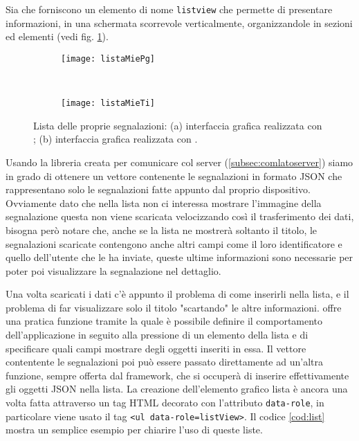             Sia \kendomob{} che \tisdk{} forniscono un elemento di nome \texttt{listview}
            che permette di presentare informazioni, in una schermata scorrevole
            verticalmente, organizzandole in sezioni ed elementi (vedi fig. \ref{fig:mieTiPg}).

            \begin{figure}[H]
              \centering
              \begin{subfigure}[b]{0.485\textwidth}
                \texttt{[image: listaMiePg]}
                \caption{}
              \end{subfigure}
              ~
              \begin{subfigure}[b]{0.485\textwidth}
                \texttt{[image: listaMieTi]}
                \caption{}
              \end{subfigure}
              \caption{Lista delle  proprie segnalazioni:
                (a) interfaccia grafica realizzata con \kendomob{};
                (b) interfaccia grafica realizzata con \tisdk{}.
                }
              \label{fig:mieTiPg}
            \end{figure}

            \noindent Usando la libreria creata per comunicare col server (\ref{subsec:comlatoserver})
            siamo in grado di ottenere un vettore contenente le segnalazioni in formato JSON che
            rappresentano solo le segnalazioni fatte appunto dal proprio dispositivo.
            Ovviamente dato che nella lista non ci interessa mostrare l'immagine della segnalazione
            questa non viene scaricata velocizzando così il
            trasferimento dei dati, bisogna però notare che, anche se la lista
            ne mostrerà soltanto il titolo, le segnalazioni scaricate contengono
            anche altri campi come il loro identificatore e quello dell'utente
            che le ha inviate, queste ultime informazioni sono necessarie per
            poter poi visualizzare la segnalazione nel dettaglio.

            Una volta scaricati i dati c'è appunto il problema di come inserirli
            nella lista, e il problema di far visualizzare solo il titolo
            "scartando" le altre informazioni.
            \kendomob{} offre una pratica funzione \js{} tramite la quale è
            possibile definire il comportamento dell'applicazione in seguito
            alla pressione di un elemento della lista e di specificare quali
            campi mostrare degli oggetti inseriti in essa. Il vettore contentente le segnalazioni
            poi può essere passato direttamente ad un'altra funzione,
            sempre offerta dal framework, che si occuperà di inserire effettivamente
            gli oggetti JSON nella lista.
            La creazione dell'elemento grafico lista è ancora una volta fatta
            attraverso un tag HTML decorato con l'attributo \texttt{data-role},
            in particolare viene usato il tag \texttt{<ul data-role=listView>}.
            Il codice \ref{cod:list} mostra un semplice esempio per
            chiarire l'uso di queste liste.

